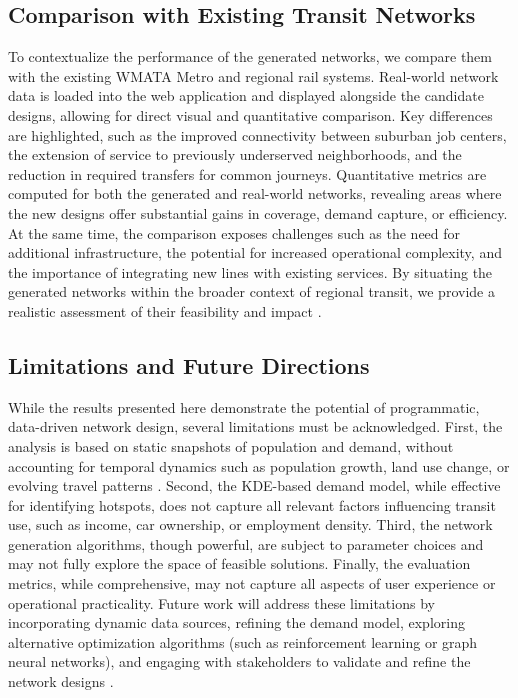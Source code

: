 \documentclass[manuscript]{acmart}
\begin{document}
\subsection{Comparison with Existing Transit Networks}
To contextualize the performance of the generated networks, we compare them with the existing WMATA Metro and regional rail systems. Real-world network data is loaded into the web application and displayed alongside the candidate designs, allowing for direct visual and quantitative comparison. Key differences are highlighted, such as the improved connectivity between suburban job centers, the extension of service to previously underserved neighborhoods, and the reduction in required transfers for common journeys. Quantitative metrics are computed for both the generated and real-world networks, revealing areas where the new designs offer substantial gains in coverage, demand capture, or efficiency. At the same time, the comparison exposes challenges such as the need for additional infrastructure, the potential for increased operational complexity, and the importance of integrating new lines with existing services. By situating the generated networks within the broader context of regional transit, we provide a realistic assessment of their feasibility and impact \cite{bib:overview-field, bib:bast2016route}.

\subsection{Limitations and Future Directions}
While the results presented here demonstrate the potential of programmatic, data-driven network design, several limitations must be acknowledged. First, the analysis is based on static snapshots of population and demand, without accounting for temporal dynamics such as population growth, land use change, or evolving travel patterns \cite{bib:overview-field}. Second, the KDE-based demand model, while effective for identifying hotspots, does not capture all relevant factors influencing transit use, such as income, car ownership, or employment density. Third, the network generation algorithms, though powerful, are subject to parameter choices and may not fully explore the space of feasible solutions. Finally, the evaluation metrics, while comprehensive, may not capture all aspects of user experience or operational practicality. Future work will address these limitations by incorporating dynamic data sources, refining the demand model, exploring alternative optimization algorithms (such as reinforcement learning or graph neural networks), and engaging with stakeholders to validate and refine the network designs \cite{bib:camporeale2017equity}.
\end{document}
